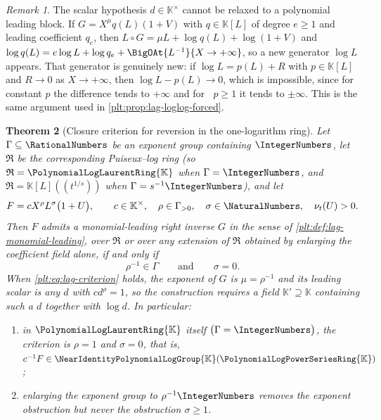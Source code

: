 \documentclass[11pt,oneside]{article}
\theoremstyle{plain}
\newtheorem{theorem}{Theorem}[section]
\theoremstyle{definition}
\theoremstyle{remark}
\newtheorem{remark}[theorem]{Remark}
\newcommand{\K}{\mathbb{K}}
\newcommand{\PLpow}{\PolynomialLogPowerSeriesRing{\K}}   %
\newcommand{\PLlau}{\PolynomialLogLaurentRing{\K}}       %
\newcommand{\Gnear}{\NearIdentityPolynomialLogGroup{\K}} %
\newcommand{\ordt}{\nu_{t}}                              %
\DeclareMathOperator{\degL}{deg_{L}}
\newcommand{\compose}{\mathbin{\circ}}
\begin{document}
\begin{remark}
\label{plt:rmk:lag-nonscalar-leading}
The scalar hypothesis \(d\in\K^\times\) cannot be relaxed to a polynomial
leading block.  If \(G=X^\mu q(L)(1+V)\) with \(q\in\K[L]\) of degree
\(e\ge1\) and leading coefficient \(q_e\), then
\(L\compose G=\mu L+\log q(L)+\log(1+V)\) and
\(\log q(L)=e\log L+\log q_e+\BigOAt{L^{-1}}{X\to+\infty}\), so a new generator
\(\log L\) appears.  That generator is genuinely new: if \(\log L=p(L)+R\) with
\(p\in\K[L]\) and \(R\to0\) as \(X\to+\infty\), then \(\log L-p(L)\to0\), which
is impossible, since for constant \(p\) the difference tends to \(+\infty\) and
for \(\degL p\ge1\) it tends to \(\pm\infty\).  This is the same argument used
in \cref{plt:prop:lag-loglog-forced}.
\end{remark}

\begin{theorem}[Closure criterion for reversion in the one-logarithm ring]
\label{plt:thm:lag-rigidity}
Let \(\Gamma\subseteq\RationalNumbers\) be an exponent group containing
\(\IntegerNumbers\), let \(\mathfrak R\) be the corresponding Puiseux--log ring
(so \(\mathfrak R=\PLlau\) when \(\Gamma=\IntegerNumbers\), and
\(\mathfrak R=\K[L]((t^{1/s}))\) when \(\Gamma=s^{-1}\IntegerNumbers\)), and let
\begin{equation}
\label{plt:eq:lag-F-monomial}
  F=cX^{\rho}L^{\sigma}\bigl(1+U\bigr),
  \qquad
  c\in\K^\times,\quad \rho\in\Gamma_{>0},\quad
  \sigma\in\NaturalNumbers,\quad \ordt(U)>0 .
\end{equation}
Then \(F\) admits a monomial-leading right inverse \(G\) in the sense of
\cref{plt:def:lag-monomial-leading}, over \(\mathfrak R\) or over any extension
of \(\mathfrak R\) obtained by enlarging the coefficient field alone, if and
only if
\begin{equation}
\label{plt:eq:lag-criterion}
  \rho^{-1}\in\Gamma
  \qquad\text{and}\qquad
  \sigma=0 .
\end{equation}
When \cref{plt:eq:lag-criterion} holds, the exponent of \(G\) is
\(\mu=\rho^{-1}\) and its leading scalar is any \(d\) with \(cd^{\rho}=1\), so
the construction requires a field \(\K'\supseteq\K\) containing such a \(d\)
together with \(\log d\).  In particular:
\begin{enumerate}
\item in \(\PLlau\) itself \(\bigl(\Gamma=\IntegerNumbers\bigr)\), the criterion
      is \(\rho=1\) and \(\sigma=0\), that is,
      \(c^{-1}F\in\Gnear(\PLpow)\);
\item enlarging the exponent group to \(\rho^{-1}\IntegerNumbers\) removes the
      exponent obstruction but never the obstruction \(\sigma\ge1\).
\end{enumerate}
\end{theorem}
\end{document}
